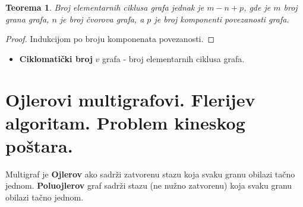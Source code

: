 \documentclass[a4paper,12pt]{article}
\numberwithin{algorithm}{section}
\theoremstyle{plain}
\newtheorem{theorem}{Teorema}[section]
\theoremstyle{definition}
\theoremstyle{remark}
\begin{document}
\begin{theorem}
    Broj elementarnih ciklusa grafa jednak je $m - n + p$, gde je $m$ broj grana grafa, $n$ je broj čvorova grafa, a $p$ je broj komponenti povezanosti grafa.
\end{theorem}
\begin{proof}
    Indukcijom po broju komponenata povezanosti.
\end{proof}
\begin{itemize}
    \item \textbf{Ciklomatički broj} $v$ grafa - broj elementarnih ciklusa grafa.
\end{itemize}
\newpage
\section{Ojlerovi multigrafovi. Flerijev algoritam. Problem kineskog poštara. }



Multigraf je \textbf{Ojlerov} ako sadrži zatvorenu stazu koja svaku granu obilazi tačno jednom. \textbf{Poluojlerov} graf sadrži stazu (ne nužno zatvorenu) koja svaku granu obilazi tačno jednom.
\end{document}
